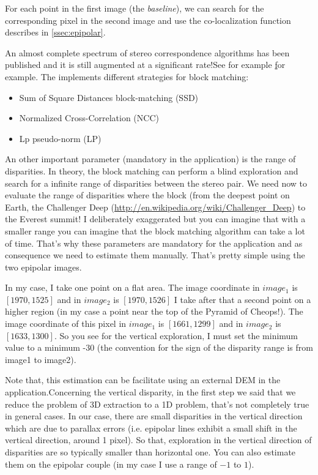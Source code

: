 For each point in the first image (the \textit{baseline}), we can search for the
corresponding pixel in the second image and use the co-localization function
describes in \ref{ssec:epipolar}.

An almost complete spectrum of stereo correspondence algorithms has been
published and it is still augmented at a significant rate!See for example
\href{http://en.wikipedia.org/wiki/Block-matching_algorithm} for example. The
\otb implements different strategies for block matching:

\begin{itemize}
\item Sum of Square Distances block-matching (SSD)
\item Normalized Cross-Correlation (NCC)
\item Lp pseudo-norm (LP)
\end{itemize}

An other important parameter (mandatory in the application) is the range of
disparities. In theory, the block matching can perform a blind exploration and
search for a infinite range of disparities between the stereo pair. We need now
to evaluate the range of disparities where the block (from the deepest point on
Earth, the Challenger Deep (\url{http://en.wikipedia.org/wiki/Challenger_Deep})
to the Everest summit!  I deliberately exaggerated but you can imagine that with
a smaller range you can imagine that the block matching algorithm can take a lot
of time.  That's why these parameters are mandatory for the application and as
consequence we need to estimate them manually. That's pretty simple using the
two epipolar images.

In my case, I take one point on a flat area. The image coordinate in $image_{1}$
is $[1970,1525]$ and in $image_{2}$ is $[1970,1526]$ I take after that a second
point on a higher region (in my case a point near the top of the Pyramid of
Cheops!). The image coordinate of this pixel in $image_{1}$ is $[1661,1299]$ and
in $image_{2}$ is $[1633,1300]$.  So you see for the vertical exploration, I
must set the minimum value to a minimum -30 (the convention for the sign of the
disparity range is from image1 to image2).

Note that, this estimation can be facilitate using an external DEM in the
 application.Concerning the
vertical disparity, in the first step we said that we reduce the problem of 3D
extraction to a 1D problem, that's not completely true in general cases. In our
case, there are small disparities in the vertical direction which are due to
parallax errors (i.e. epipolar lines exhibit a small shift in the vertical
direction, around 1 pixel). So that, exploration in the vertical direction of
disparities are so typically smaller than horizontal one. You can also estimate
them on the epipolar couple (in my case I use a range of $-1$ to $1$).

